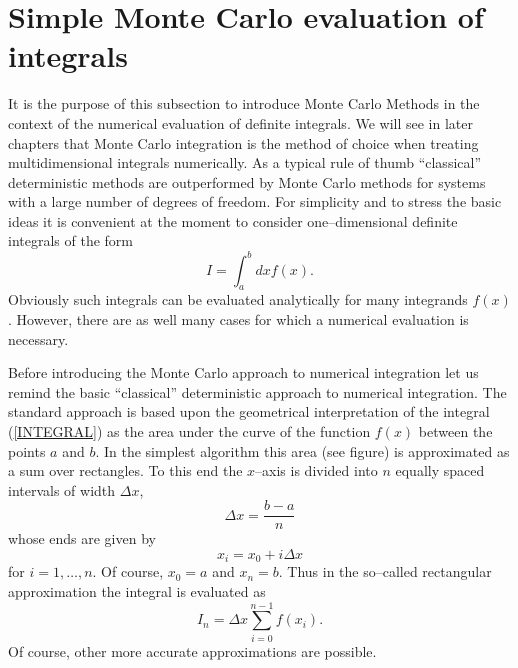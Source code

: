 \section{Simple Monte Carlo evaluation of integrals}
It is the purpose of this subsection to introduce Monte Carlo Methods
in the context of the numerical evaluation of definite integrals.
We will see in later chapters that Monte Carlo integration is the
method of choice when treating multidimensional
integrals numerically. As a typical rule of thumb
``classical'' deterministic methods are outperformed
by Monte Carlo methods  for systems with a large number of 
degrees of freedom.
For simplicity and to stress the basic ideas 
it is convenient at the moment to consider one--dimensional definite
integrals of the form
\begin{equation}
\label{INTEGRAL}
I = \int_a^b dx f(x).
\end{equation}
Obviously such integrals can be evaluated analytically for many
integrands
$f(x)$.  However, there are as well many cases for which a numerical
evaluation is necessary.

Before introducing the Monte Carlo approach to numerical integration
let us remind the basic ``classical'' deterministic approach to
numerical integration. The standard approach is based upon the
geometrical interpretation of the integral (\ref{INTEGRAL}) as the
area under the curve of the function $f(x)$ between the points $a$ and
$b$. In the simplest algorithm this area (see figure) is approximated
as a sum over rectangles. To this end the $x$--axis is divided into
$n$ equally spaced intervals of width $\Delta x$,
\begin{equation}
\Delta x = \frac{b-a}{n}
\end{equation}
whose ends are given by
\begin{equation}
x_i = x_0 + i\Delta x
\end{equation}
for $i=1, \ldots ,n$. Of course, $x_0 = a$ and $x_n =b$. Thus in the
so--called rectangular approximation the integral is evaluated as
\begin{equation}
\label{I_CLASSICAL}
I_n = \Delta x \sum_{i=0}^{n-1} f(x_i).
\end{equation}
Of course, other more accurate approximations are possible.

